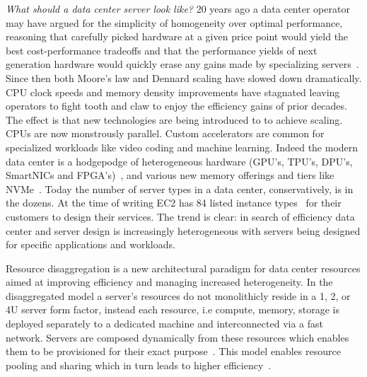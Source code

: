 \documentclass[12pt]{ucsddissertation}
\begin{document}
\begin{dissertationintroduction}

\textit{What should a data center server look like?} 20 years ago a data center operator may have
argued for the simplicity of homogeneity over optimal performance, reasoning that carefully picked
hardware at a given price point would yield the best cost-performance tradeoffs and that the
performance yields of next generation hardware would quickly erase any gains made by specializing
servers~. 
Since then both Moore's law and Dennard scaling have slowed down dramatically. CPU clock speeds and
memory density improvements have stagnated leaving operators to fight tooth and claw to enjoy the
efficiency gains of prior decades. The effect is that new technologies are being introduced to to
achieve scaling.  CPUs are now monstrously parallel. Custom accelerators are common for specialized
workloads like video coding and machine learning. Indeed the modern data center is a hodgepodge of
heterogeneous hardware (GPU's, TPU's, DPU's, SmartNICs and
FPGA's)~\cite{dsnf,azure-smartnic,tpu,nitro}, and various new memory offerings and tiers like
NVMe~\cite{decible}.  Today the number of server types in a data center, conservatively, is in the
dozens.  At the time of writing EC2 has 84 listed instance types~\cite{ec2-offer} for their
customers to design their services. The trend is clear: in search of efficiency data center and
server design is increasingly heterogeneous with servers being designed for specific applications
and workloads.

Resource disaggregation is a new architectural paradigm for data center resources aimed at improving
efficiency and managing increased heterogeneity. In the disaggregated model a server's resources do
not monolithicly reside in a 1, 2, or 4U server form factor, instead each resource, i.e compute,
memory, storage is deployed separately to a dedicated machine and interconnected via a fast network.
Servers are composed dynamically from these resources which enables them to be provisioned for their
exact purpose~\cite{dis-and-app,infiniswap,blade-server,decible,legoos}. This model enables resource
pooling and sharing which in turn leads to higher efficiency~\cite{regions,fastswap,dsnf,aifm,supernic,ditto}.



\end{dissertationintroduction}
\end{document}
